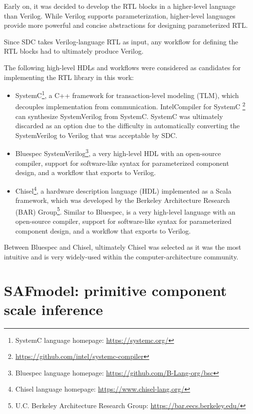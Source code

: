 Early on, it was decided to develop the RTL blocks in a higher-level language than Verilog. While Verilog supports parameterization, higher-level languages provide more powerful and concise abstractions for designing parameterized RTL. 

Since SDC takes Verilog-language RTL as input, any workflow for defining the RTL blocks had to ultimately produce Verilog.

The following high-level HDLs and workflows were considered as candidates for implementing the RTL library in this work:

\begin{itemize}
    \item SystemC\cite{systemc}\footnote{SystemC language homepage: \url{https://systemc.org/}}, a C++ framework for transaction-level modeling (TLM)\cite{systemc}, which decouples implementation from communication. Intel\textregistered Compiler for SystemC \footnote{\url{https://github.com/intel/systemc-compiler}} can synthesize SystemVerilog from SystemC. SystemC was ultimately discarded as an option due to the difficulty in automatically converting the SystemVerilog to Verilog that was acceptable by SDC.
    \item Bluespec SystemVerilog\cite{bluespec}\footnote{Bluespec language homepage: \url{https://github.com/B-Lang-org/bsc}}, a very high-level HDL with an open-source compiler, support for software-like syntax for parameterized component design, and a workflow that exports to Verilog.
    \item Chisel\cite{chisel}\footnote{Chisel language homepage: \url{https://www.chisel-lang.org/}}, a hardware description language (HDL) implemented as a Scala framework, which was developed by the Berkeley Architecture Research (BAR) Group\footnote{U.C. Berkeley Architecture Research Group: \url{https://bar.eecs.berkeley.edu/}}. Similar to Bluespec, is a very high-level language with an open-source compiler, support for software-like syntax for parameterized component design, and a workflow that exports to Verilog.
\end{itemize}

Between Bluespec and Chisel, ultimately Chisel was selected as it was the most intuitive and is very widely-used within the computer-architecture community.

\section{SAFmodel: primitive component scale inference}

